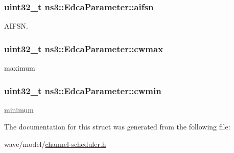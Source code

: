 \subsubsection[{\texorpdfstring{aifsn}{aifsn}}]{\setlength{\rightskip}{0pt plus 5cm}uint32\+\_\+t ns3\+::\+Edca\+Parameter\+::aifsn}\hypertarget{structns3_1_1EdcaParameter_addba51b9b303804e706625f5dbbe5eaf}{}\label{structns3_1_1EdcaParameter_addba51b9b303804e706625f5dbbe5eaf}


A\+I\+F\+SN. 

\subsubsection[{\texorpdfstring{cwmax}{cwmax}}]{\setlength{\rightskip}{0pt plus 5cm}uint32\+\_\+t ns3\+::\+Edca\+Parameter\+::cwmax}\hypertarget{structns3_1_1EdcaParameter_af771d2ef3ccbb1b66f6c90b2efea4d04}{}\label{structns3_1_1EdcaParameter_af771d2ef3ccbb1b66f6c90b2efea4d04}


maximum 

\subsubsection[{\texorpdfstring{cwmin}{cwmin}}]{\setlength{\rightskip}{0pt plus 5cm}uint32\+\_\+t ns3\+::\+Edca\+Parameter\+::cwmin}\hypertarget{structns3_1_1EdcaParameter_a5b87e4eb282d35779384ab34082bb4c6}{}\label{structns3_1_1EdcaParameter_a5b87e4eb282d35779384ab34082bb4c6}


minimum 



The documentation for this struct was generated from the following file\+:\begin{DoxyCompactItemize}
\item 
wave/model/\hyperlink{channel-scheduler_8h}{channel-\/scheduler.\+h}\end{DoxyCompactItemize}
